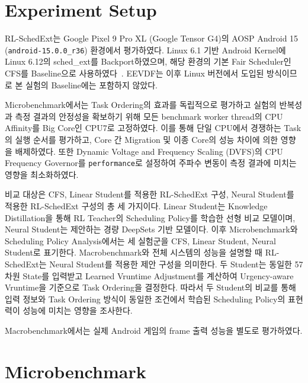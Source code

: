

\section{Experiment Setup}
\label{sec:eval-experiment-setup}
RL-SchedExt는 Google Pixel 9 Pro XL (Google Tensor G4)의 AOSP Android 15
(\texttt{android-15.0.0\_r36}) 환경에서 평가하였다. Linux 6.1 기반 Android
Kernel에 Linux 6.12의 sched\_ext를 Backport하였으며, 해당 환경의 기본
Fair Scheduler인 CFS를 Baseline으로 사용하였다~\cite{cfs,pixelkernel}.
EEVDF는 이후 Linux 버전에서 도입된 방식이므로 본 실험의 Baseline에는 포함하지 않았다.

Microbenchmark에서는 Task Ordering의 효과를 독립적으로 평가하고 실험의
반복성과 측정 결과의 안정성을 확보하기 위해 모든 benchmark worker thread의
CPU Affinity를 Big Core인 CPU7로 고정하였다. 이를 통해 단일 CPU에서
경쟁하는 Task의 실행 순서를 평가하고, Core 간 Migration 및 이종 Core의
성능 차이에 의한 영향을 배제하였다. 또한 Dynamic Voltage and Frequency Scaling (DVFS)의 CPU Frequency Governor를
\texttt{performance}로 설정하여 주파수 변동이 측정 결과에 미치는 영향을
최소화하였다.

비교 대상은 CFS, Linear Student를 적용한 RL-SchedExt 구성, Neural Student를 적용한 RL-SchedExt 구성의 총 세 가지이다.
Linear Student는 Knowledge Distillation을 통해 RL Teacher의 Scheduling Policy를 학습한 선형 비교 모델이며,
Neural Student는 제안하는 경량 DeepSets 기반 모델이다.
이후 Microbenchmark와 Scheduling Policy Analysis에서는 세 실험군을 CFS, Linear Student, Neural Student로 표기한다.
Macrobenchmark와 전체 시스템의 성능을 설명할 때 RL-SchedExt는 Neural Student를 적용한 제안 구성을 의미한다.
두 Student는 동일한 57차원 State를 입력받고 Learned Vruntime Adjustment를 계산하여
Urgency-aware Vruntime을 기준으로 Task Ordering을 결정한다.
따라서 두 Student의 비교를 통해 입력 정보와 Task Ordering 방식이 동일한 조건에서
학습된 Scheduling Policy의 표현력이 성능에 미치는 영향을 조사한다.

Macrobenchmark에서는 실제 Android 게임의
frame 출력 성능을 별도로 평가하였다.

\section{Microbenchmark}
\label{sec:eval-microbenchmark}
